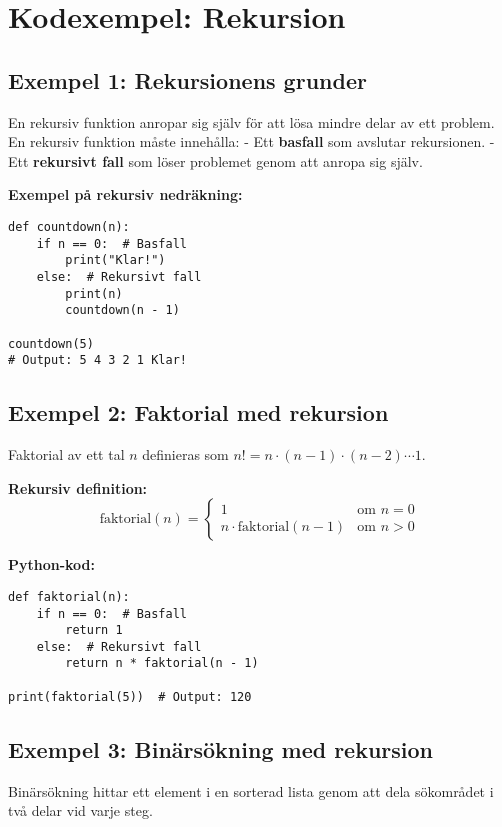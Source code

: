 \section{Kodexempel: Rekursion}
\label{examples:recursion}
\subsection*{Exempel 1: Rekursionens grunder}

En rekursiv funktion anropar sig själv för att lösa mindre delar av ett problem. En rekursiv funktion måste innehålla:
- Ett \textbf{basfall} som avslutar rekursionen.
- Ett \textbf{rekursivt fall} som löser problemet genom att anropa sig själv.

\textbf{Exempel på rekursiv nedräkning:}
\begin{lstlisting}[title=Nedräkning med rekursion]
def countdown(n):
    if n == 0:  # Basfall
        print("Klar!")
    else:  # Rekursivt fall
        print(n)
        countdown(n - 1)

countdown(5)
# Output: 5 4 3 2 1 Klar!
\end{lstlisting}

\subsection*{Exempel 2: Faktorial med rekursion}

Faktorial av ett tal \( n \) definieras som \( n! = n \cdot (n-1) \cdot (n-2) \cdots 1 \).

\textbf{Rekursiv definition:}
\[
\text{faktorial}(n) = 
\begin{cases} 
1 & \text{om } n = 0 \\
n \cdot \text{faktorial}(n-1) & \text{om } n > 0
\end{cases}
\]

\textbf{Python-kod:}
\begin{lstlisting}[title=Faktorial med rekursion]
def faktorial(n):
    if n == 0:  # Basfall
        return 1
    else:  # Rekursivt fall
        return n * faktorial(n - 1)

print(faktorial(5))  # Output: 120
\end{lstlisting}

\subsection*{Exempel 3: Binärsökning med rekursion}

Binärsökning hittar ett element i en sorterad lista genom att dela sökområdet i två delar vid varje steg.

